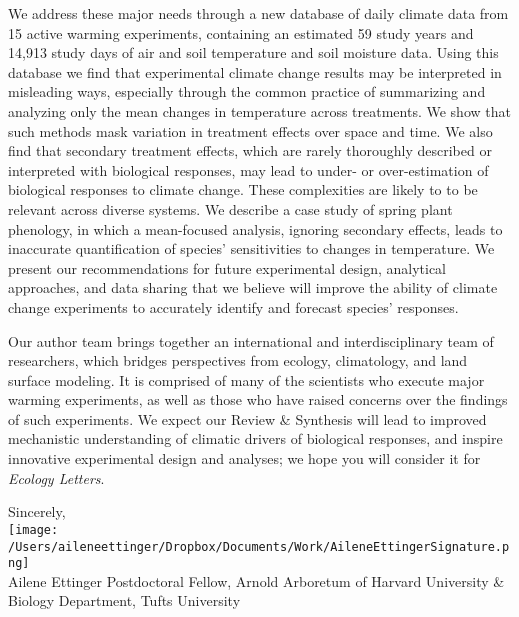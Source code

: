 \documentclass[11pt,a4paper]{letter}
\begin{document}
\begin{letter}{}
We address these major needs through a new database of daily climate data from 15 active warming experiments, containing an estimated 59 study years and 14,913 study days of air and soil temperature and soil moisture data.  Using this database we find that experimental climate change results may be interpreted in misleading ways, especially through the common practice of summarizing and analyzing only the mean changes in temperature across treatments.  We show that such methods mask variation in treatment effects over space and time. We also find that secondary treatment effects, which are rarely thoroughly described or interpreted with biological responses, may lead to under- or over-estimation of biological responses to climate change. These complexities are likely to to be relevant across diverse systems. We describe a case study of spring plant phenology, in which a mean-focused analysis, ignoring secondary effects, leads to inaccurate quantification of species' sensitivities to changes in temperature. We present our recommendations for future experimental design, analytical approaches, and data sharing that we believe will improve the ability of climate change experiments to accurately identify and forecast species' responses.

Our author team brings together an international and interdisciplinary team of researchers, which bridges perspectives from ecology, climatology, and land surface modeling. It is comprised of many of the scientists who execute major warming experiments, as well as those who have raised concerns over the findings of such experiments.  We expect our Review \& Synthesis will lead to improved mechanistic understanding of climatic drivers of biological responses, and inspire innovative experimental design and analyses; we hope you will consider it for \emph{Ecology Letters}.

Sincerely,\\

\texttt{[image: /Users/aileneettinger/Dropbox/Documents/Work/AileneEttingerSignature.png]} \\
Ailene Ettinger
Postdoctoral Fellow, Arnold Arboretum of Harvard University \& Biology Department, Tufts University


\end{letter}
\end{document}

